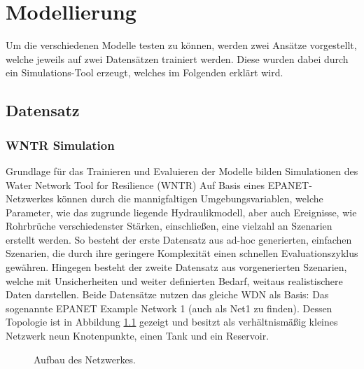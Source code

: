 \chapter{Modellierung \label{Chapter-Methods}}

Um die verschiedenen Modelle testen zu können, werden zwei Ansätze vorgestellt, welche jeweils auf zwei Datensätzen
 trainiert werden. Diese wurden dabei durch ein Simulations-Tool erzeugt, welches im Folgenden erklärt wird.

\section{Datensatz}

\subsection*{WNTR Simulation}

Grundlage für das Trainieren und Evaluieren der Modelle bilden Simulationen des Water Network Tool for Resilience
 (WNTR) \cite{klise2018overview} Auf Basis eines EPANET-Netzwerkes können durch die mannigfaltigen
 Umgebungsvariablen, welche Parameter, wie das zugrunde liegende Hydraulikmodell, aber auch Ereignisse, wie
 Rohrbrüche verschiedenster Stärken, einschließen, eine vielzahl an Szenarien erstellt werden. So besteht der erste
 Datensatz aus ad-hoc generierten, einfachen Szenarien, die durch ihre geringere Komplexität einen schnellen
 Evaluationszyklus gewähren. Hingegen besteht der zweite Datensatz aus vorgenerierten Szenarien, welche mit
 Unsicherheiten und weiter definierten Bedarf, weitaus realistischere Daten darstellen.
 Beide Datensätze nutzen das gleiche WDN als Basis:
 Das sogenannte EPANET Example Network 1 (auch als Net1 zu finden). Dessen Topologie ist in Abbildung
 \ref{fig:practice-wdn} gezeigt und besitzt als verhältnismäßig kleines Netzwerk neun Knotenpunkte, einen Tank
 und ein Reservoir.

\begin{figure}
    \centering
    \caption{Aufbau des Netzwerkes.}
    \label{fig:practice-wdn}
\end{figure}

